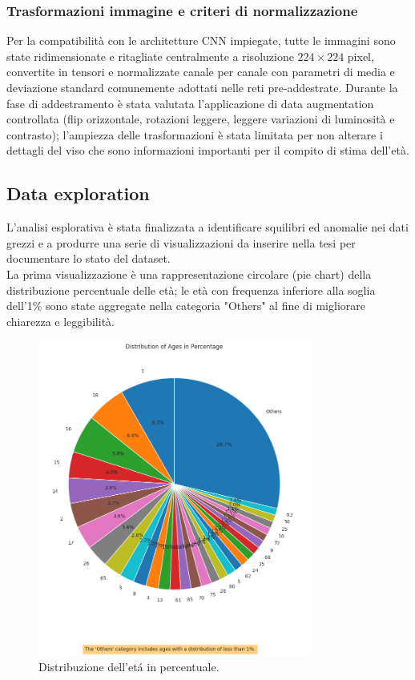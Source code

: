 \documentclass[a4paper,12pt]{report}
\begin{document}
	\subsubsection{Trasformazioni immagine e criteri di normalizzazione}
	Per la compatibilità con le architetture CNN impiegate, tutte le immagini sono state ridimensionate e ritagliate centralmente a risoluzione \(224\times224\) pixel, convertite in tensori e normalizzate canale per canale con parametri di media e deviazione standard comunemente adottati nelle reti pre-addestrate. Durante la fase di addestramento è stata valutata l'applicazione di data augmentation controllata (flip orizzontale, rotazioni leggere, leggere variazioni di luminosità e contrasto); l'ampiezza delle trasformazioni è stata limitata per non alterare i dettagli del viso che sono informazioni importanti per il compito di stima dell'età.
	
	\subsection{Data exploration}	
	L'analisi esplorativa è stata finalizzata a identificare squilibri ed anomalie nei dati grezzi e a produrre una serie di visualizzazioni da inserire nella tesi per documentare lo stato del dataset. \\
	La prima visualizzazione è una rappresentazione circolare (pie chart) della distribuzione percentuale delle età; le età con frequenza inferiore alla soglia dell'1\% sono state aggregate nella categoria "Others" al fine di migliorare chiarezza e leggibilità. \\
	
	\begin{figure}[H]
		\centering
		\includegraphics[width=0.8\textwidth]{img/ages_image.png}
		\caption{Distribuzione dell'etá in percentuale.}
	\end{figure}
	
\end{document}
